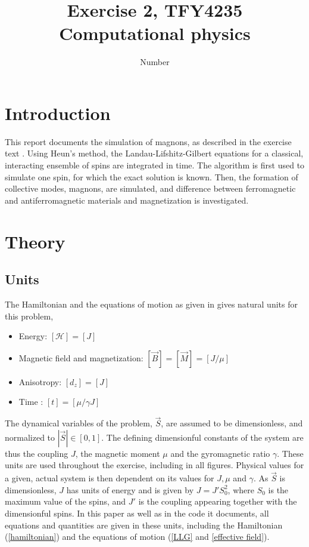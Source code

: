 \documentclass{article}
\title{Exercise 2, TFY4235 Computational physics}
\author{Number}
\date{}
\begin{document}
    \maketitle
    \section*{Introduction}
    This report documents the simulation of magnons, as described in the exercise text \cite{exercise}.
    Using Heun's method, the Landau-Lifshitz-Gilbert equations for a classical, interacting ensemble of spins are integrated in time.
    The algorithm is first used to simulate one spin, for which the exact solution is known.
    Then, the formation of collective modes, magnons, are simulated, and difference between ferromagnetic and antiferromagnetic materials and magnetization is investigated.

    \section*{Theory}
    \subsection*{Units}

    The Hamiltonian and the equations of motion as given in \cite{exercise} gives natural units for this problem,
    \begin{itemize}
        \item Energy: $[\mathcal H] = [J]$
        \item Magnetic field and magnetization: $[\vec B] = [\vec M] = [J/\mu ]$
        \item Anisotropy: $[d_z] = [J]$
        \item Time : $[t] = [\mu/\gamma J]$
    \end{itemize}
    The dynamical variables of the problem, $ \vec S $, are assumed to be dimensionless, and normalized to $|\vec S|\in[0, 1]$.
     The defining dimensionful constants of the system are thus the coupling $J$, the magnetic moment $\mu$ and the gyromagnetic ratio $\gamma$.
     These units are used throughout the exercise, including in all figures.
     Physical values for a given, actual system is then dependent on its values for $J, \mu$ and $\gamma$.
     As $\vec S$ is dimensionless, $J$ has units of energy and is given by $J = J' S_0^2$, where $S_0$ is the maximum value of the spins, and $J'$ is the coupling appearing together with the dimensionful spins.
     In this paper as well as in the code it documents, all equations and quantities are given in these units, including the Hamiltonian (\autoref{hamiltonian}) and the equations of motion (\autoref{LLG} and \autoref{effective field}).
\end{document}
